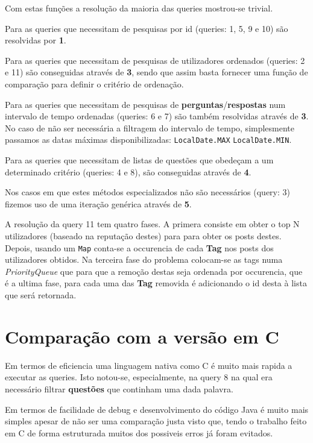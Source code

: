 \documentclass[10pt,a4paper]{report}
\begin{document}
    Com estas funções a resolução da maioria das queries mostrou-se
    trivial.

    Para as queries que necessitam de pesquisas por id (queries: 1, 5, 9 e 10)
    são resolvidas por \textbf{1}.

    Para as queries que necessitam de pesquisas de utilizadores ordenados
    (queries: 2 e 11) são conseguidas através de \textbf{3}, sendo que assim
    basta fornecer uma função de comparação para definir o critério de
    ordenação.

    Para as queries que necessitam de pesquisas de
    \textbf{perguntas}/\textbf{respostas} num intervalo de tempo ordenadas
    (queries: 6 e 7) são também resolvidas através de \textbf{3}. No caso de não
    ser necessária a filtragem do intervalo de tempo, simplesmente passamos as
    datas máximas disponibilizadas: \texttt{LocalDate.MAX}
    \texttt{LocalDate.MIN}.

    Para as queries que necessitam de listas de questões que obedeçam a um
    determinado critério (queries: 4 e 8), são conseguidas através de
    \textbf{4}.

    Nos casos em que estes métodos especializados não são necessários (query: 3)
    fizemos uso de uma iteração genérica através de \textbf{5}.

    A resolução da query 11 tem quatro fases. A primera consiste em obter o top
    N utilizadores (baseado na reputação destes) para para obter os posts
    destes.
    Depois, usando um \texttt{Map} conta-se a occurencia de cada
    \textbf{Tag} nos posts dos utilizadores obtidos. Na terceira fase do
    problema colocam-se as tags numa \textit{PriorityQueue} que para que a
    remoção destas seja ordenada por occurencia, que é a ultima fase, para cada
    uma das \textbf{Tag} removida é adicionando o id desta à lista que será
    retornada.

\chapter{Comparação com a versão em C}
    Em termos de eficiencia uma linguagem nativa como C é muito mais rapida a
    executar as queries. Isto notou-se, especialmente, na query 8 na qual era
    necessário filtrar \textbf{questões} que continham uma dada palavra.

    Em termos de facilidade de debug e desenvolvimento do código Java é muito
    mais simples apesar de não ser uma comparação justa visto que, tendo o
    trabalho feito em C de forma estruturada muitos dos possiveis erros já foram
    evitados.
\end{document}
